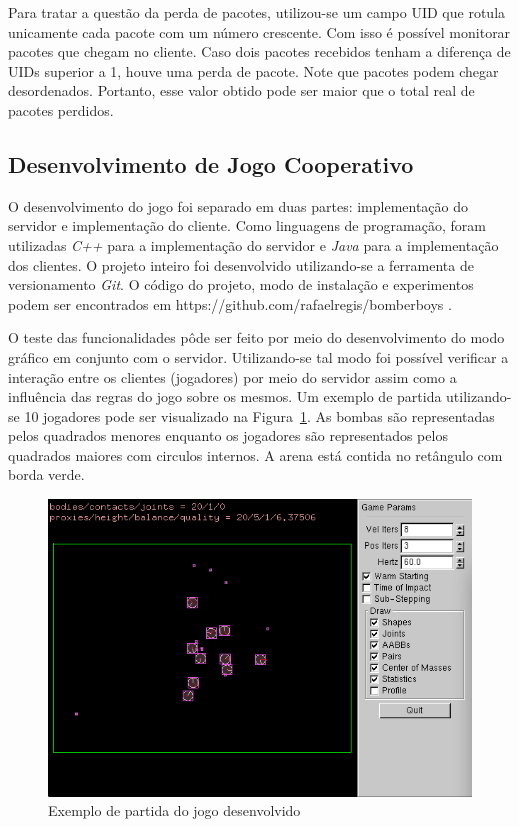 \documentclass[12pt]{article}
\begin{document}
Para tratar a questão da perda de pacotes, utilizou-se um campo UID que rotula
unicamente cada pacote com um número crescente. Com isso é possível monitorar
pacotes que chegam no cliente. Caso dois pacotes recebidos tenham a diferença
de UIDs superior a 1, houve uma perda de pacote. Note que pacotes podem chegar desordenados. Portanto, esse valor obtido pode ser maior que o total real de pacotes perdidos.

\subsection{Desenvolvimento de Jogo Cooperativo} \label{sub:desenvolvimento}

O desenvolvimento do jogo foi separado em duas partes: implementação do
servidor e implementação do cliente. Como linguagens de programação, foram
utilizadas \emph{C++} para a implementação do servidor e \emph{Java} para a implementação dos
clientes.  O projeto inteiro foi desenvolvido utilizando-se a ferramenta de
versionamento \emph{Git}. O código do projeto, modo de instalação e experimentos podem
ser encontrados em https://github.com/rafaelregis/bomberboys .

O teste das funcionalidades pôde ser feito por meio do desenvolvimento do modo
gráfico em conjunto com o servidor. Utilizando-se tal modo foi possível
verificar a interação entre os clientes (jogadores) por meio do servidor assim
como a influência das regras do jogo sobre os mesmos. Um exemplo de partida
utilizando-se 10 jogadores pode ser visualizado na Figura~\ref{fig:partida}. As
bombas são representadas pelos quadrados menores enquanto os jogadores são
representados pelos quadrados maiores com circulos internos. A arena está
contida no retângulo com borda verde.

\begin{figure}[ht]
  \centering
  \includegraphics[width=.8\textwidth]{img/partida.png}
  \caption{Exemplo de partida do jogo desenvolvido}
  \label{fig:partida}
\end{figure}
\end{document}
